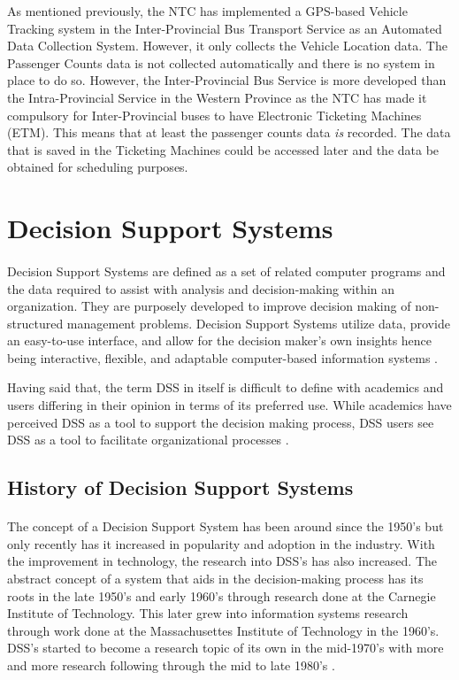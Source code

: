 As mentioned previously, the NTC has implemented a GPS-based Vehicle Tracking system in the Inter-Provincial Bus Transport Service as an Automated Data Collection System. However, it only collects the Vehicle Location data. The Passenger Counts data is not collected automatically and there is no system in place to do so. However, the Inter-Provincial Bus Service is more developed than the Intra-Provincial Service in the Western Province as the NTC has made it compulsory for Inter-Provincial buses to have Electronic Ticketing Machines (ETM). This means that at least the passenger counts data \textit{is} recorded. The data that is saved in the Ticketing Machines could be accessed later and the data be obtained for scheduling purposes.

\section{Decision Support Systems}
\label {section-DSS}

\paragraph{ } Decision Support Systems are defined as a set of related computer programs and the data required to assist with analysis and decision-making within an organization. They are purposely developed to improve decision making of non-structured management problems. Decision Support Systems utilize data, provide an easy-to-use interface, and allow for the decision maker’s own insights hence being interactive, flexible, and adaptable computer-based information systems \cite{Turban2005}. 

Having said that, the term DSS in itself is difficult to define with academics and users differing in their opinion in terms of its preferred use. While academics have perceived DSS as a tool to support the decision making process, DSS users see DSS as a tool to facilitate organizational processes \cite{Keen1980}.

\subsection{History of Decision Support Systems}

\paragraph{ } The concept of a Decision Support System has been around since the 1950's but only recently has it increased in popularity and adoption in the industry. With the improvement in technology, the research into DSS's has also increased. The abstract concept of a system that aids in the decision-making process has its roots in the late 1950's and early 1960's through research done at the Carnegie Institute of Technology. This later grew into information systems research through work done at the Massachusettes Institute of Technology in the 1960's. DSS's started to become a research topic of its own in the mid-1970's with more and more research following through the mid to late 1980's \cite{Keen1980, Power2003}.

